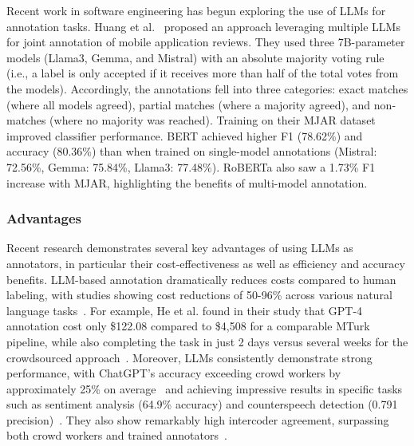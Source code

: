 \documentclass[11pt]{article}
\begin{document}
Recent work in software engineering has begun exploring the use of LLMs for annotation tasks.
Huang et al.~\cite{Huang2023Enhancing} proposed an approach leveraging multiple LLMs for joint annotation of mobile application reviews. 
They used three 7B-parameter models (Llama3, Gemma, and Mistral) with an absolute majority voting rule (i.e., a label is only accepted if it receives more than half of the total votes from the models). 
Accordingly, the annotations fell into three categories: exact matches (where all models agreed), partial matches (where a majority agreed), and non-matches (where no majority was reached).
Training on their MJAR dataset improved classifier performance. BERT achieved higher F1 (78.62\%) and accuracy (80.36\%) than when trained on single-model annotations (Mistral: 72.56\%, Gemma: 75.84\%, Llama3: 77.48\%). RoBERTa also saw a 1.73\% F1 increase with MJAR, highlighting the benefits of multi-model annotation.

\subsubsection{Advantages}

Recent research demonstrates several key advantages of using LLMs as annotators, in particular their cost-effectiveness as well as efficiency and accuracy benefits.
LLM-based annotation dramatically reduces costs compared to human labeling, with studies showing cost reductions of 50-96\% across various natural language tasks~\cite{DBLP:conf/emnlp/WangLXZZ21}.
For example, He et al. found in their study that GPT-4 annotation cost only \$122.08 compared to \$4,508 for a comparable MTurk pipeline, while also completing the task in just 2 days versus several weeks for the crowdsourced approach~\cite{DBLP:conf/chi/HeHDRH24}.
Moreover, LLMs consistently demonstrate strong performance, with ChatGPT's accuracy exceeding crowd workers by approximately 25\% on average~\cite{DBLP:journals/corr/abs-2303-15056} and achieving impressive results in specific tasks such as sentiment analysis (64.9\% accuracy) and counterspeech detection (0.791 precision)~\cite{DBLP:journals/corr/abs-2304-10145}. They also show remarkably high intercoder agreement, surpassing both crowd workers and trained annotators~\cite{DBLP:journals/corr/abs-2303-15056}.
\end{document}
